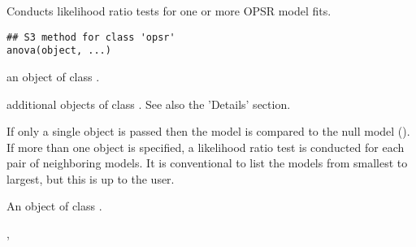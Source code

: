 %
\begin{Description}
Conducts likelihood ratio tests for one or more OPSR model fits.
\end{Description}
%
\begin{Usage}
\begin{verbatim}
## S3 method for class 'opsr'
anova(object, ...)
\end{verbatim}
\end{Usage}
%
\begin{Arguments}
\begin{ldescription}
\item[\code{object}] an object of class .

\item[\code{...}] additional objects of class . See also the 'Details' section.
\end{ldescription}
\end{Arguments}
%
\begin{Details}
If only a single object is passed then the model is compared to the null model
(). If more than one object is specified, a likelihood ratio
test is conducted for each pair of neighboring models. It is conventional to
list the models from smallest to largest, but this is up to the user.
\end{Details}
%
\begin{Value}
An object of class .
\end{Value}
%
\begin{SeeAlso}
, 
\end{SeeAlso}
%
\begin{Examples}
\end{Examples}


